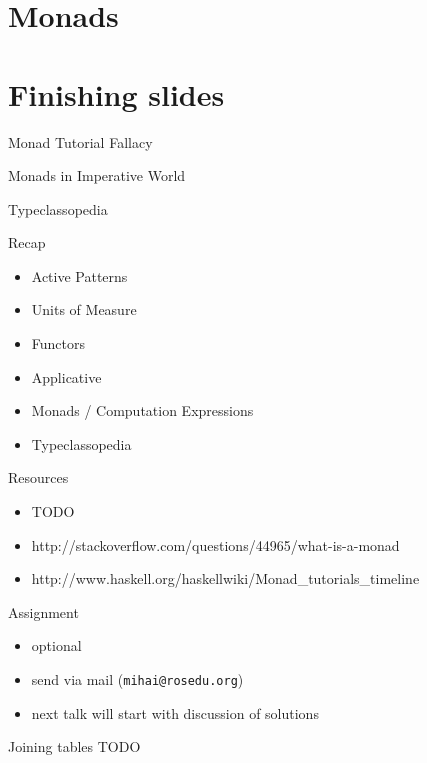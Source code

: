 \documentclass{beamer}
\begin{document}
\section{Monads}
\frame{\tableofcontents[currentsection]}

\section{Finishing slides}
\frame{\tableofcontents[currentsection]}

\begin{frame}{Monad Tutorial Fallacy}
\end{frame}

\begin{frame}{Monads in Imperative World}
\end{frame}

\begin{frame}{Typeclassopedia}
\end{frame}

\begin{frame}{Recap}
  \begin{itemize}[<+->]
    \item Active Patterns
    \item Units of Measure
    \item Functors
    \item Applicative
    \item Monads / Computation Expressions
    \item Typeclassopedia
  \end{itemize}
\end{frame}

\begin{frame}{Resources}
  \begin{itemize}
    \item TODO
    \item http://stackoverflow.com/questions/44965/what-is-a-monad
    \item http://www.haskell.org/haskellwiki/Monad\_tutorials\_timeline
  \end{itemize}
\end{frame}

\begin{frame}[fragile]{Assignment}
  \begin{itemize}
    \item optional
    \item send via mail (\texttt{mihai@rosedu.org})
    \item next talk will start with discussion of solutions
  \end{itemize}
  \pause
  \begin{block}{Joining tables}
  TODO
  \end{block}
\end{frame}
\end{document}
